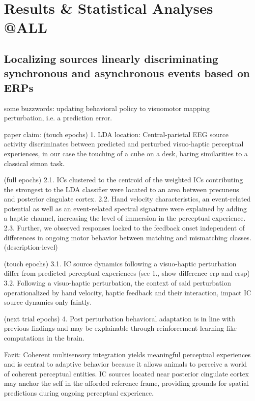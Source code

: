 \section{Results \& Statistical Analyses @ALL}
\subsection{Localizing sources linearly discriminating synchronous and asynchronous events based on ERPs}

some buzzwords:
updating behavioral policy to 
visuomotor mapping
perturbation, i.e. a prediction error.

paper claim:
(touch epochs)
1. LDA location: Central-parietal EEG source activity discriminates between predicted and perturbed visuo-haptic perceptual experiences, in our case the touching of a cube on a desk, baring similarities to a classical simon task.

(full epochs)
2.1. ICs clustered to the centroid of the weighted ICs contributing the strongest to the LDA classifier were located to an area between precuneus and posterior cingulate cortex.
2.2. Hand velocity characteristics, an event-related potential as well as an event-related spectral signature were explained by adding a haptic channel, increasing the level of immersion in the perceptual experience.
2.3. Further, we observed responses locked to the feedback onset independent of differences in ongoing motor behavior between matching and mismatching classes. (description-level)

(touch epochs)
3.1. IC source dynamics following a visuo-haptic perturbation differ from predicted perceptual experiences (see 1., show difference erp and ersp)
3.2. Following a visuo-haptic perturbation, the context of said perturbation operationalized by hand velocity, haptic feedback and their interaction, impact IC source dynamics only faintly.

(next trial epochs)
4. Post perturbation behavioral adaptation is in line with previous findings and may be explainable through reinforcement learning like computations in the brain.

Fazit:
Coherent multisensory integration yields meaningful perceptual experiences and is central to adaptive behavior because it allows animals to perceive a world of coherent perceptual entities. IC sources located near posterior cingulate cortex may anchor the self in the afforded reference frame, providing grounds for spatial predictions during ongoing perceptual experience.

